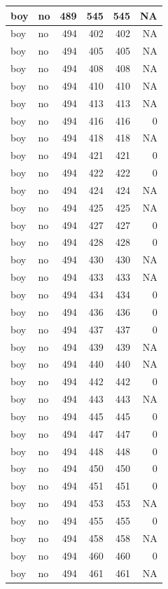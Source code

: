 \documentclass[man]{apa6}
\begin{document}
\begin{tabular}{l|l|r|r|r|r}
\hline
boy & no & 489 & 545 & 545 & NA\\
\hline
boy & no & 494 & 402 & 402 & NA\\
\hline
boy & no & 494 & 405 & 405 & NA\\
\hline
boy & no & 494 & 408 & 408 & NA\\
\hline
boy & no & 494 & 410 & 410 & NA\\
\hline
boy & no & 494 & 413 & 413 & NA\\
\hline
boy & no & 494 & 416 & 416 & 0\\
\hline
boy & no & 494 & 418 & 418 & NA\\
\hline
boy & no & 494 & 421 & 421 & 0\\
\hline
boy & no & 494 & 422 & 422 & 0\\
\hline
boy & no & 494 & 424 & 424 & NA\\
\hline
boy & no & 494 & 425 & 425 & NA\\
\hline
boy & no & 494 & 427 & 427 & 0\\
\hline
boy & no & 494 & 428 & 428 & 0\\
\hline
boy & no & 494 & 430 & 430 & NA\\
\hline
boy & no & 494 & 433 & 433 & NA\\
\hline
boy & no & 494 & 434 & 434 & 0\\
\hline
boy & no & 494 & 436 & 436 & 0\\
\hline
boy & no & 494 & 437 & 437 & 0\\
\hline
boy & no & 494 & 439 & 439 & NA\\
\hline
boy & no & 494 & 440 & 440 & NA\\
\hline
boy & no & 494 & 442 & 442 & 0\\
\hline
boy & no & 494 & 443 & 443 & NA\\
\hline
boy & no & 494 & 445 & 445 & 0\\
\hline
boy & no & 494 & 447 & 447 & 0\\
\hline
boy & no & 494 & 448 & 448 & 0\\
\hline
boy & no & 494 & 450 & 450 & 0\\
\hline
boy & no & 494 & 451 & 451 & 0\\
\hline
boy & no & 494 & 453 & 453 & NA\\
\hline
boy & no & 494 & 455 & 455 & 0\\
\hline
boy & no & 494 & 458 & 458 & NA\\
\hline
boy & no & 494 & 460 & 460 & 0\\
\hline
boy & no & 494 & 461 & 461 & NA\\

\end{tabular}
\end{document}
